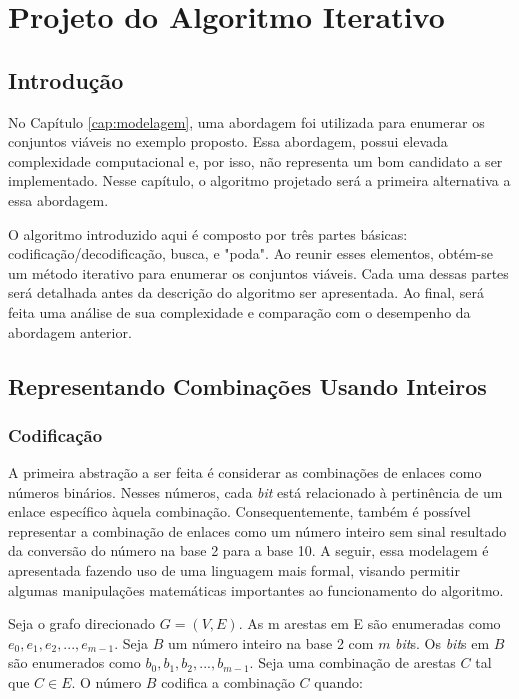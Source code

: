 \chapter{Projeto do Algoritmo Iterativo}
\label{cap:iterativo}

\section{Introdução}

No Capítulo \ref{cap:modelagem}, uma abordagem foi utilizada para enumerar os conjuntos viáveis no exemplo proposto. Essa abordagem, possui elevada complexidade computacional e, por isso, não representa um bom candidato a ser implementado. Nesse capítulo, o algoritmo projetado será a primeira alternativa a essa abordagem.

O algoritmo introduzido aqui é composto por três partes básicas: codificação/decodificação, busca, e "poda". Ao reunir esses elementos, obtém-se um método iterativo para enumerar os conjuntos viáveis. Cada uma dessas partes será detalhada antes da descrição do algoritmo ser apresentada. Ao final, será feita uma análise de sua complexidade e comparação com o desempenho da abordagem anterior. 

\section{Representando Combinações Usando Inteiros}

\subsection{Codificação}

A primeira abstração a ser feita é considerar as combinações de enlaces como números binários. Nesses números, cada {\it bit} está relacionado à pertinência de um enlace específico àquela combinação. Consequentemente, também é possível representar a combinação de enlaces como um número inteiro sem sinal resultado da conversão do número na base 2 para a base 10. A seguir, essa modelagem é apresentada fazendo uso de uma linguagem mais formal, visando permitir algumas manipulações matemáticas importantes ao funcionamento do algoritmo.

Seja o grafo direcionado $G=(V,E)$. As m arestas em E são enumeradas como $e_0, e_1, e_2, ..., e_{m-1}$. Seja $B$ um número inteiro na base 2 com $m$ {\it bit}s. Os {\it bit}s em $B$ são enumerados como $b_0, b_1, b_2, ..., b_{m-1}$. Seja uma combinação de arestas $C$ tal que $C \in E$. O número $B$ codifica a combinação $C$ quando:

